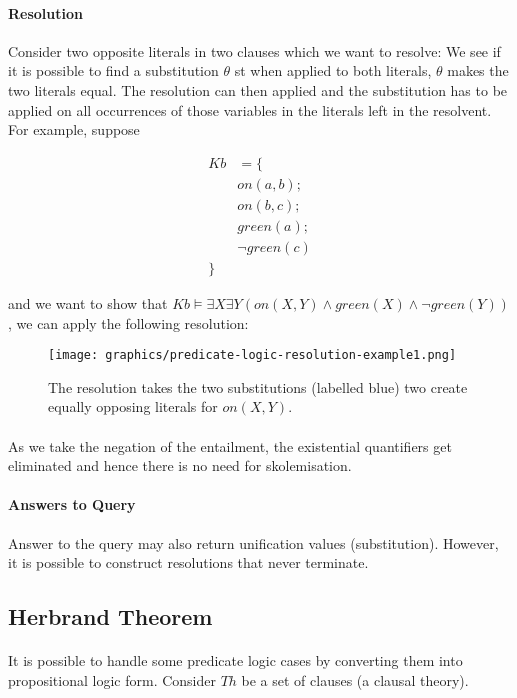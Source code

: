 \documentclass{article}
\theoremstyle{plain}
\theoremstyle{definition}
\begin{document}
\begin{multicols}{2}
\paragraph{Resolution} Consider two opposite literals in two clauses which we want to resolve: We see if it is possible to find a substitution $\theta$ st when applied to both literals, $\theta$ makes the two literals equal. The resolution can then applied and the substitution has to be applied on all occurrences of those variables in the literals left in the resolvent. For example, suppose

\begin{align*}
Kb &= \{\\
	&on(a, b);\\
	&on(b, c);\\
	&green(a);\\
	&\lnot green(c)\\
	\}&
\end{align*}

\noindent and we want to show that $Kb \models \exists X \exists Y (on(X, Y) \land green(X) \land \lnot green(Y))$, we can apply the following resolution:

\begin{figure}[H]
\centering
\texttt{[image: graphics/predicate-logic-resolution-example1.png]}
\caption{The resolution takes the two substitutions (labelled blue) two create equally opposing literals for $on(X, Y)$.}
\end{figure}

\paragraph{} As we take the negation of the entailment, the existential quantifiers get eliminated and hence there is no need for skolemisation.

\paragraph{Answers to Query} Answer to the query may also return unification values (substitution). However, it is possible to construct resolutions that never terminate.

\subsection{Herbrand Theorem}

\paragraph{} It is possible to handle some predicate logic cases by converting them into propositional logic form. Consider $Th$ be a set of clauses (a clausal theory).


\end{multicols}
\end{document}
